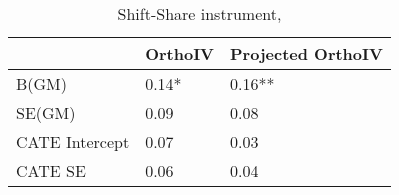 \begin{table}\centering\caption{Shift-Share instrument, }\begin{tabular}{lll}
\toprule
                & OrthoIV   & Projected OrthoIV   \\
\midrule
 B(GM)          & 0.14*     & 0.16**              \\
 SE(GM)         & 0.09      & 0.08                \\
 CATE Intercept & 0.07      & 0.03                \\
 CATE SE        & 0.06      & 0.04                \\
\bottomrule
\end{tabular}\end{table}